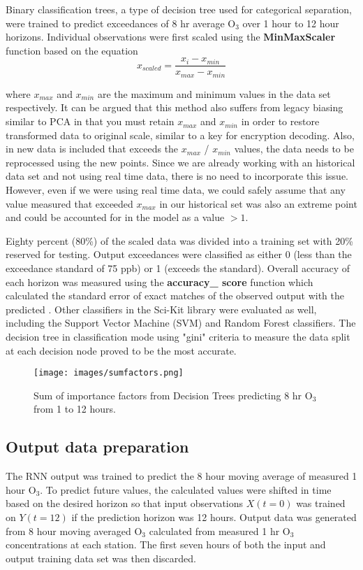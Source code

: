 \documentclass[preprint,12pt,authoryear]{elsarticle}
\begin{document}
\begin{linenumbers}
Binary classification trees, a type of decision tree used for categorical separation,  were trained to predict exceedances of 8 hr average O$_{3}$ over 1 hour to 12 hour horizons. Individual observations were first scaled using the \textbf{MinMaxScaler} function based on the equation
%
\begin{equation}
\label{eq:MaxMin}
x_{scaled} = \frac{x_{i} - x_{min}}{x_{max} - x_{min}}
\end{equation}
%

where $x_{max}$ and $x_{min}$ are the maximum and minimum values in the data set respectively. It can be argued that this method also suffers from legacy biasing similar to PCA in that you must retain $x_{max}$ and $x_{min}$ in order to restore transformed data to original scale, similar to a key for encryption decoding. Also, in new data is included that exceeds the $x_{max}$ / $x_{min}$ values, the data needs to be reprocessed using the new points. Since we are already working with an historical data set and not using real time data, there is no need to incorporate this issue. However, even if we were using real time data, we could safely assume that any value measured that exceeded $x_{max}$ in our historical set was also an extreme point and could be accounted for in the model as a value $>1$. 

Eighty percent (80\%) of the scaled data was divided into a training set with 20\% reserved for testing.  Output exceedances were classified as either 0 (less than the exceedance standard of 75 ppb) or 1 (exceeds the standard). Overall accuracy of each horizon was measured using the \textbf{accuracy\_ score} function which calculated the standard error of exact matches of the observed output with the predicted \citep{Raschka2016}.  Other classifiers in the Sci-Kit library were evaluated as well, including the Support Vector Machine (SVM) and Random Forest classifiers. The decision tree in classification mode using "gini" criteria to measure the data split at each decision node proved to be the most accurate.

%
\begin{figure}[H]
\centering
\texttt{[image: images/sumfactors.png]}  %
\caption{Sum of importance factors from Decision Trees predicting 8 hr O$_{3}$ from 1 to 12 hours.}
\label{fig:importance}
\end{figure}
%

\subsection{Output data preparation}
The RNN output was trained to predict the 8 hour moving average of measured 1 hour O$_{3}$. To predict future values, the calculated values were shifted in time based on the desired horizon so that input observations $X(t=0)$ was trained on $Y(t=12)$ if the prediction horizon was 12 hours. Output data was generated from 8 hour moving averaged O$_{3}$ calculated from measured 1 hr O$_{3}$ concentrations at each station. The first seven hours of both the input and output training data set was then discarded. 


\end{linenumbers}
\end{document}
